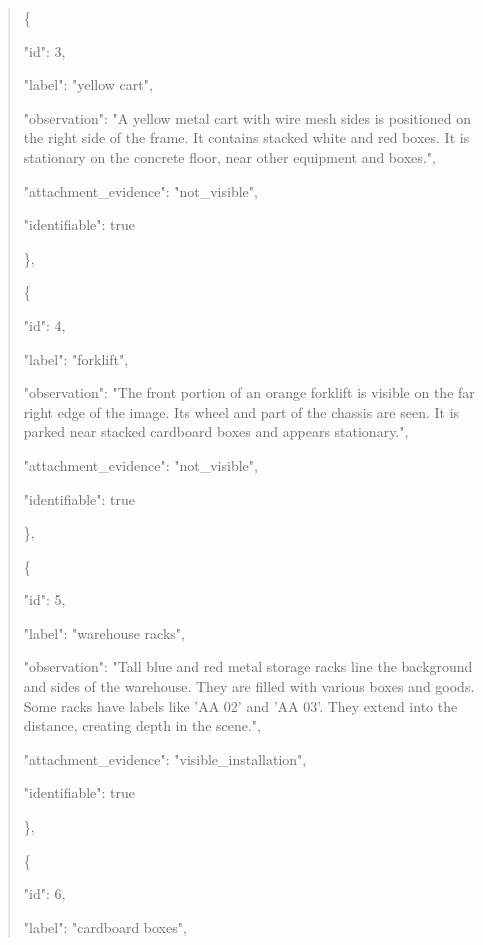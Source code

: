 \documentclass[10pt,a4paper]{article}
\begin{document}
\begin{quote}
    \{\par
      "id":\allowbreak{} 3,\allowbreak{}\par
      "label":\allowbreak{} "yellow cart",\allowbreak{}\par
      "observation":\allowbreak{} "A yellow metal cart with wire mesh sides is positioned on the right side of the frame. It contains stacked white and red boxes. It is stationary on the concrete floor,\allowbreak{} near other equipment and boxes.",\allowbreak{}\par
      "attachment\_evidence":\allowbreak{} "not\_visible",\allowbreak{}\par
      "identifiable":\allowbreak{} true\par
    \},\allowbreak{}\par
    \{\par
      "id":\allowbreak{} 4,\allowbreak{}\par
      "label":\allowbreak{} "forklift",\allowbreak{}\par
      "observation":\allowbreak{} "The front portion of an orange forklift is visible on the far right edge of the image. Its wheel and part of the chassis are seen. It is parked near stacked cardboard boxes and appears stationary.",\allowbreak{}\par
      "attachment\_evidence":\allowbreak{} "not\_visible",\allowbreak{}\par
      "identifiable":\allowbreak{} true\par
    \},\allowbreak{}\par
    \{\par
      "id":\allowbreak{} 5,\allowbreak{}\par
      "label":\allowbreak{} "warehouse racks",\allowbreak{}\par
      "observation":\allowbreak{} "Tall blue and red metal storage racks line the background and sides of the warehouse. They are filled with various boxes and goods. Some racks have labels like 'AA 02' and 'AA 03'. They extend into the distance,\allowbreak{} creating depth in the scene.",\allowbreak{}\par
      "attachment\_evidence":\allowbreak{} "visible\_installation",\allowbreak{}\par
      "identifiable":\allowbreak{} true\par
    \},\allowbreak{}\par
    \{\par
      "id":\allowbreak{} 6,\allowbreak{}\par
      "label":\allowbreak{} "cardboard boxes",\allowbreak{}\par

\end{quote}
\end{document}
